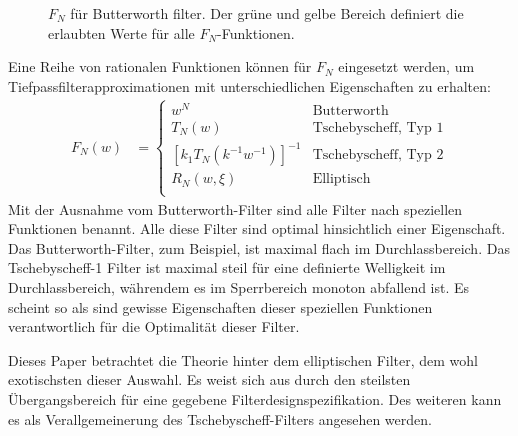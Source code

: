 \begin{figure}
    \centering
    
    \caption{$F_N$ für Butterworth filter. Der grüne und gelbe Bereich definiert die erlaubten Werte für alle $F_N$-Funktionen.}
    \label{ellfilter:fig:butterworth}
\end{figure}
Eine Reihe von rationalen Funktionen können für $F_N$ eingesetzt werden, um Tiefpassfilter\-approximationen mit unterschiedlichen Eigenschaften zu erhalten:
\begin{align}
    F_N(w) & =
    \begin{cases}
        w^N                            & \text{Butterworth} \\
        T_N(w)                         & \text{Tschebyscheff, Typ 1}  \\
        [k_1 T_N (k^{-1} w^{-1})]^{-1} & \text{Tschebyscheff, Typ 2}  \\
        R_N(w, \xi)                    & \text{Elliptisch}    \\
    \end{cases}
\end{align}
Mit der Ausnahme vom Butterworth-Filter sind alle Filter nach speziellen Funktionen benannt.
Alle diese Filter sind optimal hinsichtlich einer Eigenschaft.
Das Butterworth-Filter, zum Beispiel, ist maximal flach im Durchlassbereich.
Das Tschebyscheff-1 Filter ist maximal steil für eine definierte Welligkeit im Durchlassbereich, währendem es im Sperrbereich monoton abfallend ist.
Es scheint so als sind gewisse Eigenschaften dieser speziellen Funktionen verantwortlich für die Optimalität dieser Filter.

Dieses Paper betrachtet die Theorie hinter dem elliptischen Filter, dem wohl exotischsten dieser Auswahl.
Es weist sich aus durch den steilsten Übergangsbereich für eine gegebene Filterdesignspezifikation.
Des weiteren kann es als Verallgemeinerung des Tschebyscheff-Filters angesehen werden.

